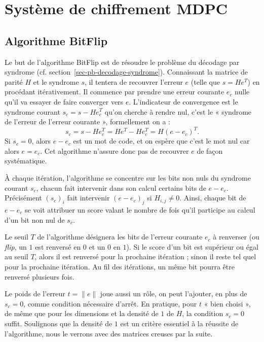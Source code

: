 \documentclass[11pt,a4paper]{article}
\newcommand{\hw}[1]{\lVert#1\rVert}
\newcommand{\transpose}[1]{#1^{T}}
\begin{document}
\section{Système de chiffrement MDPC}

\subsection{Algorithme BitFlip}

Le but de l'algorithme BitFlip est de résoudre le problème du décodage par
syndrome (cf. section~\ref{sec-pb-decodage-syndrome}).
Connaissant la matrice de parité $H$ et le syndrome $s$, il tentera de recouvrer
l'erreur $e$ (telle que $s = H\transpose{e}$) en procédant itérativement.
Il commence par prendre une erreur courante $e_c$ nulle qu'il va essayer de faire
converger vers $e$.
L'indicateur de convergence est le syndrome courant $s_c = s - H
\transpose{e_c}$ qu'on cherche à rendre nul, c'est le « syndrome de l'erreur de
l'erreur courante », formellement on a :
\begin{equation*}
    s_c = s - H \transpose{e_c}
    = H \transpose{e} - H \transpose{e_c}
    = H \transpose{(e - e_c)}.
\end{equation*}
Si $s_c = 0$, alors $e - e_c$ est un mot de code, et on espère que c'est le mot
nul car alors $e = e_c$.
Cet algorithme n'assure donc pas de recouvrer $e$ de façon systématique.

À chaque itération, l'algorithme se concentre sur les bits non nuls du syndrome
courant $s_c$, chacun fait intervenir dans son calcul certains bits de $e -
e_c$. Précisément $(s_c)_i$ fait intervenir $(e - e_c)_j$ si $H_{i, j} \neq 0$.
Ainsi, chaque bit de $e - e_c$ se voit attribuer un score valant le
nombre de fois qu'il participe au calcul d'un bit non nul de $s_c$.

Le seuil $T$ de l'algorithme désignera les bits de l'erreur courante $e_c$ à
renverser (ou \emph{flip}, un $1$ est renversé en $0$ et un $0$ en $1$). Si le
score d'un bit est supérieur ou égal au seuil $T$, alors il est renversé pour la
prochaine itération ; sinon il reste tel quel pour la prochaine itération. Au
fil des itérations, un même bit pourra être renversé plusieurs fois.

Le poids de l'erreur $t = \hw{e}$ joue aussi un rôle, on peut l'ajouter, en plus
de $s_c = 0$, comme condition nécessaire d'arrêt. En pratique, pour $t$ « bien
choisi », de même que pour les dimensions et la densité de $1$ de $H$, la
condition $s_c = 0$ suffit.
Soulignons que la densité de $1$ est un critère essentiel à la réussite de
l'algorithme, nous le verrons avec des matrices creuses par la suite.
\end{document}
